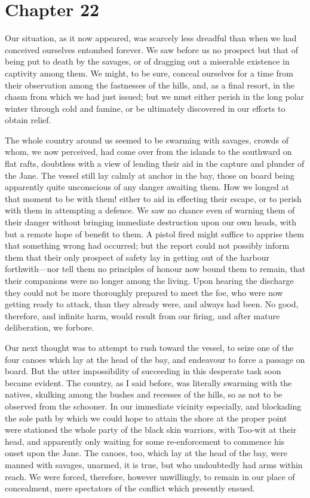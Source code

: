 \section{Chapter 22}
Our situation, as it now appeared, was scarcely less dreadful than when we
had conceived ourselves entombed forever. We saw before us no prospect but that
of being put to death by the savages, or of dragging out a miserable existence
in captivity among them. We might, to be sure, conceal ourselves for a time from
their observation among the fastnesses of the hills, and, as a final resort, in
the chasm from which we had just issued; but we must either perish in the long
polar winter through cold and famine, or be ultimately discovered in our efforts
to obtain relief. 

The whole country around us seemed to be swarming with savages, crowds of
whom, we now perceived, had come over from the islands to the southward on flat
rafts, doubtless with a view of lending their aid in the capture and plunder of
the Jane. The vessel still lay calmly at anchor in the bay, those on board being
apparently quite unconscious of any danger awaiting them. How we longed at that
moment to be with them! either to aid in effecting their escape, or to perish
with them in attempting a defence. We saw no chance even of warning them of
their danger without bringing immediate destruction upon our own heads, with but
a remote hope of benefit to them. A pistol fired might suffice to apprise them
that something wrong had occurred; but the report could not possibly inform them
that their only prospect of safety lay in getting out of the harbour
forthwith---nor tell them no principles of honour now bound them to remain, that
their companions were no longer among the living. Upon hearing the discharge
they could not be more thoroughly prepared to meet the foe, who were now getting
ready to attack, than they already were, and always had been. No good,
therefore, and infinite harm, would result from our firing, and after mature
deliberation, we forbore. 

Our next thought was to attempt to rush toward the vessel, to seize one of
the four canoes which lay at the head of the bay, and endeavour to force a
passage on board. But the utter impossibility of succeeding in this desperate
task soon became evident. The country, as I said before, was literally swarming
with the natives, skulking among the bushes and recesses of the hills, so as not
to be observed from the schooner. In our immediate vicinity especially, and
blockading the sole path by which we could hope to attain the shore at the
proper point were stationed the whole party of the black skin warriors, with
Too-wit at their head, and apparently only waiting for some re-enforcement to
commence his onset upon the Jane. The canoes, too, which lay at the head of the
bay, were manned with savages, unarmed, it is true, but who undoubtedly had arms
within reach. We were forced, therefore, however unwillingly, to remain in our
place of concealment, mere spectators of the conflict which presently
ensued. 

